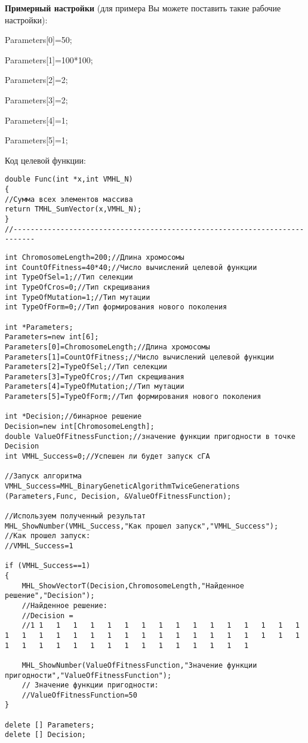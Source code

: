 \documentclass[a4paper,12pt]{article}
\begin{document}
\textbf{Примерный настройки} (для примера Вы можете поставить такие рабочие настройки):

 Parameters[0]=50;
 
Parameters[1]=100*100;

Parameters[2]=2;

Parameters[3]=2;

Parameters[4]=1;

Parameters[5]=1;

Код целевой функции:
\begin{lstlisting}[caption=Оптимизируемая функция]
double Func(int *x,int VMHL_N)
{
//Сумма всех элементов массива
return TMHL_SumVector(x,VMHL_N);
}
//---------------------------------------------------------------------------
\end{lstlisting}


\begin{lstlisting}[label=code_use_MHL_BinaryGeneticAlgorithmTwiceGenerations,caption=Пример использования]
int ChromosomeLength=200;//Длина хромосомы
int CountOfFitness=40*40;//Число вычислений целевой функции
int TypeOfSel=1;//Тип селекции
int TypeOfCros=0;//Тип скрещивания
int TypeOfMutation=1;//Тип мутации
int TypeOfForm=0;//Тип формирования нового поколения

int *Parameters;
Parameters=new int[6];
Parameters[0]=ChromosomeLength;//Длина хромосомы
Parameters[1]=CountOfFitness;//Число вычислений целевой функции
Parameters[2]=TypeOfSel;//Тип селекции
Parameters[3]=TypeOfCros;//Тип скрещивания
Parameters[4]=TypeOfMutation;//Тип мутации
Parameters[5]=TypeOfForm;//Тип формирования нового поколения

int *Decision;//бинарное решение
Decision=new int[ChromosomeLength];
double ValueOfFitnessFunction;//значение функции пригодности в точке Decision
int VMHL_Success=0;//Успешен ли будет запуск cГА

//Запуск алгоритма
VMHL_Success=MHL_BinaryGeneticAlgorithmTwiceGenerations (Parameters,Func, Decision, &ValueOfFitnessFunction);

//Используем полученный результат
MHL_ShowNumber(VMHL_Success,"Как прошел запуск","VMHL_Success");
//Как прошел запуск:
//VMHL_Success=1

if (VMHL_Success==1)
{
    MHL_ShowVectorT(Decision,ChromosomeLength,"Найденное решение","Decision");
    //Найденное решение:
    //Decision =
    //1	1	1	1	1	1	1	1	1	1	1	1	1	1	1	1	1	1	1	1	1	1	1	1	1	1	1	1	1	1	1	1	1	1	1	1	1	1	1	1	1	1	1	1	1	1	1	1	1	1

    MHL_ShowNumber(ValueOfFitnessFunction,"Значение функции пригодности","ValueOfFitnessFunction");
    // Значение функции пригодности:
    //ValueOfFitnessFunction=50
}

delete [] Parameters;
delete [] Decision;
\end{lstlisting}
\end{document}
